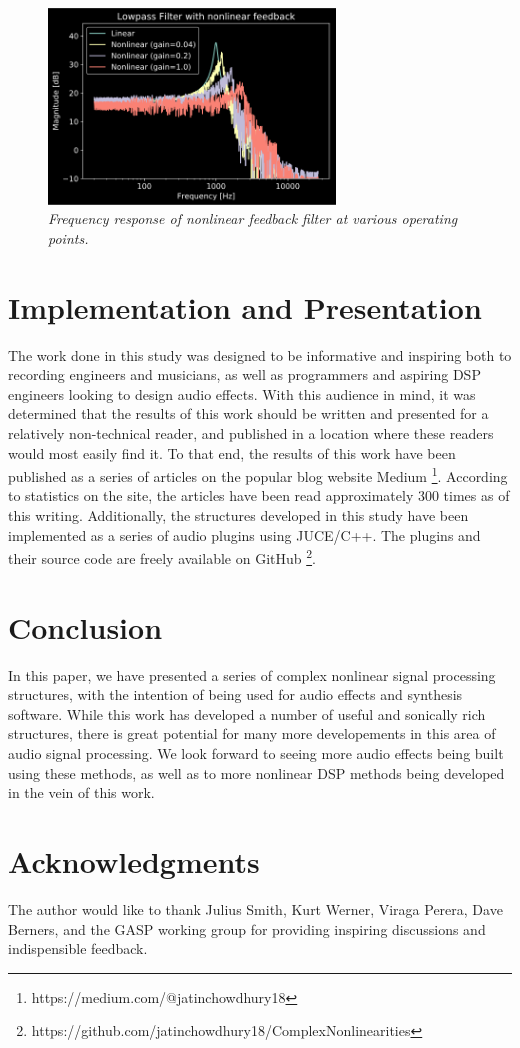 \documentclass[twoside,a4paper]{article}
\begin{document}
%
\begin{figure}[h]
    \center
    \includegraphics[width=3in]{../NonlinearFeedback/Pics/LPF-NL.png}
    \caption{\label{nlfd-lpf}{\it Frequency response of nonlinear feedback filter at
    various operating points.}}
\end{figure}
%

\section{Implementation and Presentation} \label{sec:pres}
%
The work done in this study was designed to be informative and inspiring
both to recording engineers and musicians, as well as programmers and
aspiring DSP engineers looking to design audio effects. With this audience
in mind, it was determined that the results of this work should be written
and presented for a relatively non-technical reader, and published in a
location where these readers would most easily find it. To that end, the
results of this work have been published as a series of articles on the
popular blog website Medium \footnote{https://medium.com/@jatinchowdhury18}.
According to statistics on the site, the articles have been read approximately
300 times as of this writing. Additionally, the structures developed
in this study have been implemented as a series of audio plugins using JUCE/C++.
The plugins and their source code are freely available on GitHub
\footnote{https://github.com/jatinchowdhury18/ComplexNonlinearities}.

\section{Conclusion} \label{sec:conclusion}
%
In this paper, we have presented a series of complex nonlinear signal
processing structures, with the intention of being used for audio effects
and synthesis software. While this work has developed a number of useful
and sonically rich structures, there is great potential for many more
developements in this area of audio signal processing. We look forward
to seeing more audio effects being built using these methods, as well as to
more nonlinear DSP methods being developed in the vein of this work.

\section{Acknowledgments}
%
The author would like to thank Julius Smith, Kurt Werner, Viraga Perera,
Dave Berners, and the GASP working group for providing inspiring discussions
and indispensible feedback.

\nocite{*}


\end{document}
